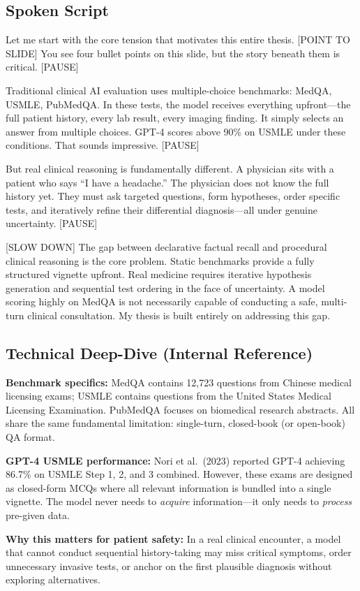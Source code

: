 \documentclass[12pt]{article}
\begin{document}
  \subsection*{Spoken Script}
  \begin{spokenbox}
   Let me start with the core tension that motivates this entire thesis. [POINT TO SLIDE] You see four bullet points on this slide, but the story beneath them is critical. [PAUSE]

  Traditional clinical AI evaluation uses multiple-choice benchmarks: MedQA, USMLE, PubMedQA. In these tests, the model receives everything upfront---the full patient history, every lab result, every imaging finding. It simply selects an answer from multiple choices. GPT-4 scores above 90\% on USMLE under these conditions. That sounds impressive. [PAUSE]

  But real clinical reasoning is fundamentally different. A physician sits with a patient who says ``I have a headache.'' The physician does not know the full history yet. They must ask targeted questions, form hypotheses, order specific tests, and iteratively refine their differential diagnosis---all under genuine uncertainty. [PAUSE]

  [SLOW DOWN] The gap between declarative factual recall and procedural clinical reasoning is the core problem. Static benchmarks provide a fully structured vignette upfront. Real medicine requires iterative hypothesis generation and sequential test ordering in the face of uncertainty. A model scoring highly on MedQA is not necessarily capable of conducting a safe, multi-turn clinical consultation. My thesis is built entirely on addressing this gap.
  \end{spokenbox}

  \subsection*{Technical Deep-Dive (Internal Reference)}
  {\color{techgray}
  \textbf{Benchmark specifics:} MedQA contains 12,723 questions from Chinese medical licensing exams; USMLE contains questions from the United States Medical Licensing Examination. PubMedQA focuses on biomedical research abstracts. All share the same fundamental limitation: single-turn, closed-book (or open-book) QA format.

  \textbf{GPT-4 USMLE performance:} Nori et al.\ (2023) reported GPT-4 achieving 86.7\% on USMLE Step 1, 2, and 3 combined. However, these exams are designed as closed-form MCQs where all relevant information is bundled into a single vignette. The model never needs to \textit{acquire} information---it only needs to \textit{process} pre-given data.

  \textbf{Why this matters for patient safety:} In a real clinical encounter, a model that cannot conduct sequential history-taking may miss critical symptoms, order unnecessary invasive tests, or anchor on the first plausible diagnosis without exploring alternatives.
  }
\end{document}
